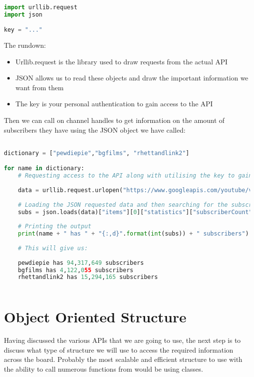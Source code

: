 \documentclass[12pt, letterpaper]{article}
\begin{document}
\begin{lstlisting}[language=python]

import urllib.request
import json

key = "..."
\end{lstlisting}

The rundown:
\begin{itemize}
	\item Urllib.request is the library used to draw requests from the actual API
	\item JSON allows us to read these objects and draw the important information we want from them
	\item The key is your personal authentication to gain access to the API
\end{itemize}

Then we can call on channel handles to get information on the amount of subscribers they have using the JSON object we have called:

\begin{lstlisting}[language=python]

dictionary = ["pewdiepie","bgfilms", "rhettandlink2"]

for name in dictionary:
	# Requesting access to the API along with utilising the key to gain access
    
    data = urllib.request.urlopen("https://www.googleapis.com/youtube/v3/channels?part=statistics&forUsername="+name+"&key="+key).read()
    
    # Loading the JSON requested data and then searching for the subscriber count
    subs = json.loads(data)["items"][0]["statistics"]["subscriberCount"]
   
    # Printing the output
    print(name + " has " + "{:,d}".format(int(subs)) + " subscribers")
    
    # This will give us:
   
    pewdiepie has 94,317,649 subscribers
	bgfilms has 4,122,055 subscribers
	rhettandlink2 has 15,294,165 subscribers
    
\end{lstlisting}

\section{Object Oriented Structure}
Having discussed the various APIs that we are going to use, the next step is to discuss what type of structure we will use to access the required information across the board. Probably the most scalable and efficient structure to use with the ability to call numerous functions from would be using classes.
\end{document}
